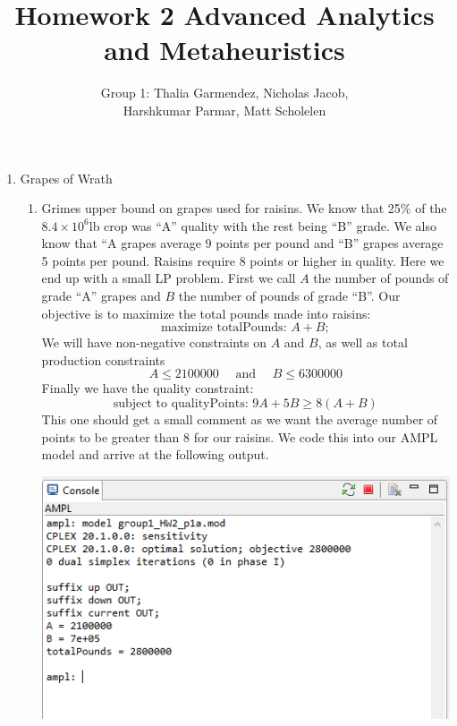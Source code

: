 \documentclass[11pt]{article}
\author{Group 1:  Thalia Garmendez, Nicholas Jacob,\\ Harshkumar Parmar, Matt Scholelen}
\title{Homework 2 Advanced Analytics and Metaheuristics}
\begin{document}
\maketitle
%
\begin{enumerate}
\item Grapes of Wrath
\begin{enumerate}
\item Grimes upper bound on grapes used for raisins.  We know that 25\% of the $8.4\times10^6$lb crop was ``A'' quality with the rest being ``B'' grade.  We also know that ``A grapes average 9 points per pound and ``B'' grapes average 5 points per pound.  Raisins require 8 points or higher in quality.  Here we end up with a small LP problem.  First we call $A$ the number of pounds of grade ``A'' grapes and $B$ the number of pounds of grade ``B''.  Our objective is to maximize the total pounds made into raisins:
\[
\text{maximize totalPounds: }A +B;
\]
We will have non-negative constraints on $A$ and $B$, as well as total production constraints
\[
A\leq 2 100 000\quad\text{ and }\quad B\leq 6 300 000
\]
Finally we have the quality constraint:
\[
\text{subject to qualityPoints: }9A +5B \geq 8\left(A+B\right)
\]
This one should get a small comment as we want the average number of points to be greater than 8 for our raisins.  We code this into our AMPL model and arrive at the following output.


\includegraphics[width = .9\textwidth]{outputp1a.png}


\end{enumerate}
\end{enumerate}
\end{document}
